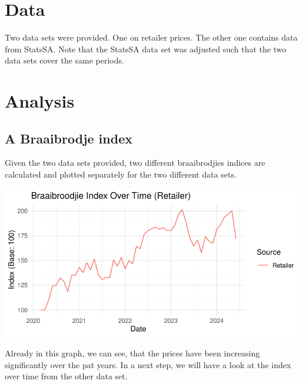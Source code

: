 \documentclass[11pt,preprint, authoryear]{elsarticle}
\let\origfigure\figure
\let\endorigfigure\endfigure
\renewenvironment{figure}[1][2] {
    \expandafter\origfigure\expandafter[H]
} {
    \endorigfigure
}
\numberwithin{equation}{section}
\numberwithin{figure}{section}
\numberwithin{table}{section}
\begin{document}
\hypertarget{data}{%
\section{Data}\label{data}}

Two data sets were provided. One on retailer prices. The other one
contains data from StatsSA. Note that the StatsSA data set was adjusted
such that the two data sets cover the same periods.

\hypertarget{analysis}{%
\section{Analysis}\label{analysis}}

\hypertarget{a-braaibrodje-index}{%
\subsection{A Braaibrodje index}\label{a-braaibrodje-index}}

Given the two data sets provided, two different braaibrodjies indices
are calculated and plotted separately for the two different data sets.\\

\begin{figure}[H]

{\centering \includegraphics{Question5_files/figure-latex/Figure1-1} 

}

\caption{Braaibrodjie Index Stats SA Retailer \label{Figure1}}\label{fig:Figure1}
\end{figure}

Already in this graph, we can see, that the prices have been increasing
significantly over the pat years. In a next step, we will have a look at
the index over time from the other data set.
\end{document}
